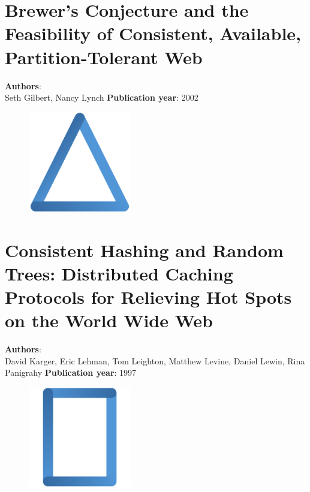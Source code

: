 \documentclass[11pt,fleqn]{book} %
\begin{document}
\chapter{Brewer’s Conjecture and the Feasibility of Consistent, Available, Partition-Tolerant Web}
\vspace*{-7mm}
\Large \textbf{Authors}: \\
Seth Gilbert, Nancy Lynch
\newline\newline
\textbf{Publication year}: 2002
\begin{figure}[b]
    \centering
    \includegraphics[width=0.4\textwidth]{distributed-systems-triangle-blue.pdf}
\end{figure}


\chapter{Consistent Hashing and Random Trees: Distributed Caching Protocols for Relieving Hot Spots on the World Wide Web}
\vspace*{-7mm}
\Large \textbf{Authors}: \\
David Karger, Eric Lehman, Tom Leighton, Matthew Levine, Daniel Lewin, Rina Panigrahy
\newline\newline
\textbf{Publication year}: 1997
\begin{figure}[b]
    \centering
    \includegraphics[width=0.4\textwidth]{distributed-systems-rectangle-blue.pdf}
\end{figure}

\end{document}
